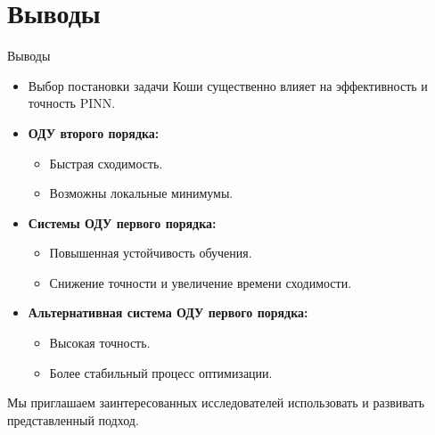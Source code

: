 \documentclass{beamer}
\begin{document}
\section{Выводы}
\begin{frame}{Выводы}
    \begin{itemize}
        \item Выбор постановки задачи Коши существенно влияет на эффективность и точность PINN.
        \item \textbf{ОДУ второго порядка:}
        \begin{itemize}
            \item Быстрая сходимость.
            \item Возможны локальные минимумы.
        \end{itemize}
        \item \textbf{Системы ОДУ первого порядка:}
        \begin{itemize}
            \item Повышенная устойчивость обучения.
            \item Снижение точности и увеличение времени сходимости.
        \end{itemize}
        \item \textbf{Альтернативная система ОДУ первого порядка:}
        \begin{itemize}
            \item Высокая точность.
            \item Более стабильный процесс оптимизации.
        \end{itemize}
    \end{itemize}
    \vspace{0.5cm}
    Мы приглашаем заинтересованных исследователей использовать и развивать представленный подход.~
\end{frame}

\printbibliography
\end{document}
